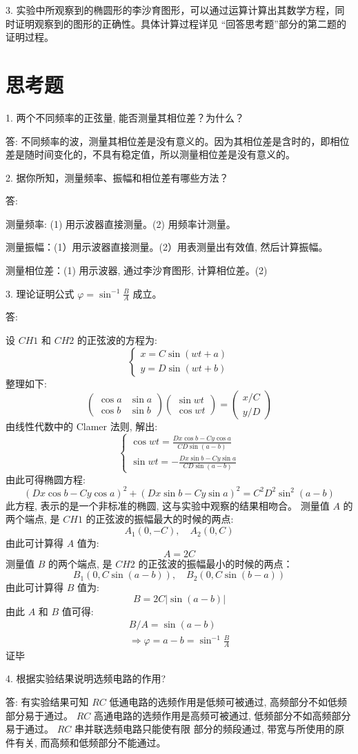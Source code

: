 \documentclass[lang=cn,11pt]{elegantpaper}
\begin{document}
3. 实验中所观察到的椭圆形的李沙育图形，可以通过运算计算出其数学方程，同时证明观察到的图形的正确性。具体计算过程详见 “回答思考题”部分的第二题的证明过程。

\section{思考题}
1. 两个不同频率的正弦量, 能否测量其相位差？为什么？

答: 不同频率的波，测量其相位差是没有意义的。因为其相位差是含时的，即相位差是随时间变化的，不具有稳定值，所以测量相位差是没有意义的。

2. 据你所知，测量频率、振幅和相位差有哪些方法？

答:

测量频率: (1) 用示波器直接测量。(2) 用频率计测量。

测量振幅：(1）用示波器直接测量。(2）用表测量出有效值, 然后计算振幅。

测量相位差：(1) 用示波器, 通过李沙育图形, 计算相位差。(2)

3. 理论证明公式 $\varphi=\sin ^{-1} \frac{B}{A}$ 成立。

答:

设 $C H 1$ 和 $C H 2$ 的正弦波的方程为:
$$
\left\{\begin{array}{l}
x=C \sin (w t+a) \\
y=D \sin (w t+b)
\end{array}\right.
$$
整理如下:
$$
\left(\begin{array}{cc}
\cos a & \sin a \\
\cos b & \sin b
\end{array}\right)\left(\begin{array}{c}
\sin w t \\
\cos w t
\end{array}\right)=\left(\begin{array}{l}
x / C \\
y / D
\end{array}\right)
$$
由线性代数中的 Clamer 法则, 解出:
$$
\left\{\begin{array}{l}
\cos w t=\frac{D x \cos b-C y \cos a}{C D \sin (a-b)} \\
\sin w t=-\frac{D x \sin b-C y \sin a}{C D \sin (a-b)}
\end{array}\right.
$$
由此可得椭圆方程:
$$
(D x \cos b-C y \cos a)^{2}+(D x \sin b-C y \sin a)^{2}=C^{2} D^{2} \sin ^{2}(a-b)
$$
此方程, 表示的是一个非标准的椭圆, 这与实验中观察的结果相吻合。 测量值 $A$ 的两个端点, 是 $C H 1$ 的正弦波的振幅最大的时候的两点:
$$
A_{1}(0,-C), \quad A_{2}(0, C)
$$
由此可计算得 $A$ 值为:
$$
A=2 C
$$
测量值 $B$ 的两个端点, 是 $C H 2$ 的正弦波的振幅最小的时候的两点：
$$
B_{1}(0, C \sin (a-b)), \quad B_{2}(0, C \sin (b-a))
$$
由此可计算得 $B$ 值为:
$$
B=2 C|\sin (a-b)|
$$
由此 $A$ 和 $B$ 值可得:
$$
\begin{gathered}
B / A=\sin (a-b) \\
\Rightarrow \varphi=a-b=\sin ^{-1} \frac{B}{A}
\end{gathered}
$$
证毕

4. 根据实验结果说明选频电路的作用?

答: 有实验结果可知 $R C$ 低通电路的选频作用是低频可被通过, 高频部分不如低频部分易于通过。 $R C$ 高通电路的选频作用是高频可被通过, 低频部分不如高频部分易于通过。 $R C$ 串并联选频电路只能使有限 部分的频段通过, 带宽与所使用的原件有关, 而高频和低频部分不能通过。
\end{document}
